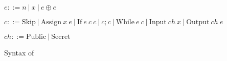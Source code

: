 \begin{figure}[ht]

$e ::= n\ |\ x\ |\ e \oplus e$

$c ::=
\mathrm{Skip}\
|\ \mathrm{Assign}~x~e\
|\ \mathrm{If}~e~c~c\
|\ c;c\
|\ \mathrm{While}~e~c\
|\ \mathrm{Input}~ch~x\
|\ \mathrm{Output}~ch~e\
$

$ch ::= \mathrm{Public}\ |\ \mathrm{Secret}$

\caption{\label{fig:lang_syntax} Syntax of \whilelang}
\end{figure}
